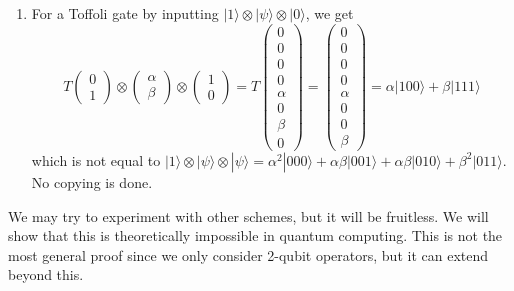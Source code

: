 \documentclass{article}
\begin{document}
\begin{enumerate}
      \item For a Toffoli gate by inputting $|1\rangle \otimes |\psi \rangle \otimes |0\rangle$, we get
        \begin{equation} 
          T \begin{pmatrix} 0 \\ 1 \end{pmatrix} \otimes \begin{pmatrix} \alpha \\ \beta \end{pmatrix} \otimes \begin{pmatrix} 1 \\ 0 \end{pmatrix} = T \begin{pmatrix} 0\\0\\0\\0\\ \alpha \\ 0 \\ \beta \\ 0 \end{pmatrix} = \begin{pmatrix} 0\\0\\0\\0\\ \alpha \\ 0 \\ 0 \\ \beta \end{pmatrix} = \alpha |100\rangle + \beta |111\rangle
        \end{equation}
      which is not equal to $|1\rangle \otimes |\psi \rangle \otimes |\psi\rangle = \alpha^2 |000\rangle + \alpha \beta |001 \rangle + \alpha \beta |010\rangle + \beta^2 |011\rangle$. No copying is done.
    \end{enumerate}

    We may try to experiment with other schemes, but it will be fruitless. We will show that this is theoretically impossible in quantum computing. This is not the most general proof since we only consider 2-qubit operators, but it can extend beyond this. 
\end{document}
